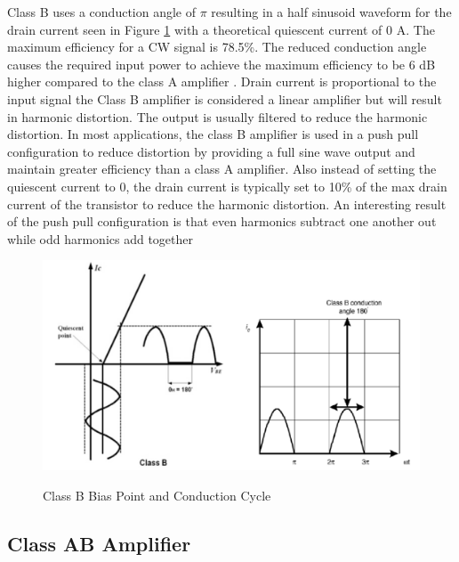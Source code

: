 Class B uses a conduction angle of $\pi$ resulting in a half sinusoid waveform for the drain current seen in Figure \ref{classb_bias} with a theoretical quiescent current of 0 A. The maximum efficiency for a CW signal is 78.5\%. The reduced conduction angle causes the required input power to achieve the maximum efficiency to be 6 dB higher compared to the class A amplifier \cite{C.Cripps2006}.
Drain current is proportional to the input signal the Class B amplifier is considered a linear amplifier but will result in harmonic distortion. The output is usually filtered to reduce the harmonic distortion\cite{Raab2003}.
In most applications, the class B amplifier is used in a push pull configuration to reduce distortion by providing a full sine wave output and maintain greater efficiency than a class A amplifier. Also instead of setting the quiescent current to 0, the drain current is typically set to 10\% of the max drain current of the transistor to reduce the harmonic distortion. An interesting result of the push pull configuration is that even harmonics subtract one another out while odd harmonics add together \cite{Rosu2001}

\begin{figure}
  \centering
  \includegraphics[width=6in]{figures/classes/classb_bias}\\
  \caption{Class B Bias Point and Conduction Cycle \cite{Rosu2001}}\label{classb_bias}
\end{figure}


\subsection{Class AB Amplifier}

